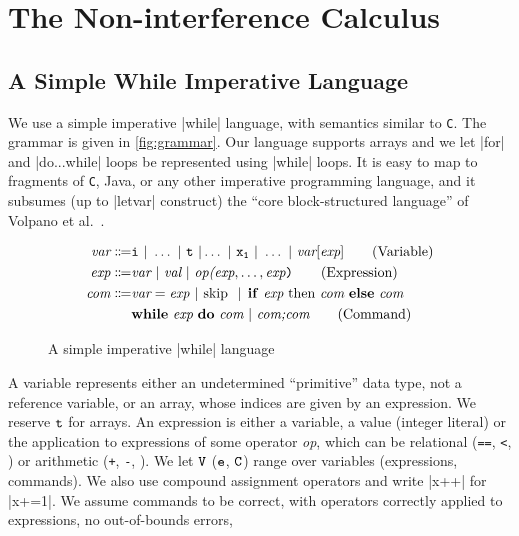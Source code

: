 \documentclass[conference]{IEEEtran}
\begin{document}
\section{The Non-interference Calculus}
\label{sec:calculus}

\subsection{A Simple While Imperative Language}
\label{subsec:language}

We use a simple imperative \textnormal{\prc|while|} language, with semantics similar to \texttt{C}.
The grammar is given in \autoref{fig:grammar}.
Our language supports arrays %
and we let \prc|for| and \prc|do...while| loops be represented using \prc|while| loops.
It is easy to map to fragments of \texttt{C}, Java, or any other imperative programming language, and it subsumes (up to \prc|letvar| construct) the \enquote{core block-structured language} of Volpano et al.~\cite{VolpanoI1996}.

\begin{figure}
	\begin{align*}
		\emph{var} \Coloneqq & \comm{i} \ | \ %
		\hdots \ | \ %
		\comm{t}
		\ | \hdots \ | \ \comm{x_1}%
		\ | \ \hdots %
		\ | \ \emph{var}[\emph{exp}] \tag{Variable} \\
		\emph{exp} \Coloneqq & \emph{var} \ |\ \emph{val} \ |\ \emph{op(}\emph{exp}, \hdots,\emph{exp}\texttt{)} \tag{Expression}                                                                                    \\
		\emph{com} \Coloneqq & \emph{var} \gets \mathit{exp}\ |\  \textnormal{\prc|skip|}\ %
		\ | \
		\textnormal{\prc|if| } \emph{exp} \text{ \prc|then| } \emph{com} \text{ \prc|else| } \emph{com} \\
		& \textnormal{\prc|while| } \emph{exp} \text{ \prc|do| } \emph{com}\ | \ \emph{com;com}
		\tag{Command}
	\end{align*}
	\caption{A simple imperative \prc|while| language}
	\label{fig:grammar}
\end{figure}

A variable represents either an undetermined \enquote{primitive} data type, \eg not a reference variable, or an array, whose indices are given by an expression.
We reserve %
$\mathtt{t}$ for arrays.
An expression is either a variable, a value (\eg integer literal) or the application to expressions of some operator \emph{op}, which can be \eg relational (\texttt{==},  \texttt{<}, \etc) or arithmetic  (\texttt{+}, \texttt{-}, \etc).
We let \(\mathtt{V}\) (\resp \(\mathtt{e}\), \(\mathtt{C}\)) range over variables (\resp expressions, commands).
We also use compound assignment operators and write \eg \prc|x++| for \prc|x+=1|.
We assume commands to be correct, \eg with operators correctly applied to expressions, no out-of-bounds errors, \etc
\end{document}
